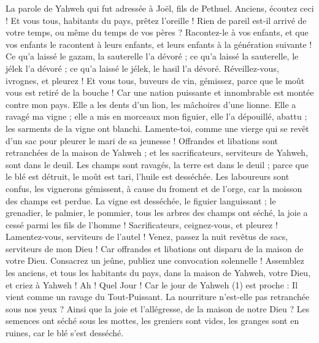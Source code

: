 \BFont
\begin{multicols}{2}
\TextTitle{[Introduction]}
\VerseOne{}La parole de Yahweh qui fut adressée à Joël, fils de Pethuel.
Anciens, écoutez ceci ! Et vous tous, habitants du pays, prêtez l'oreille ! Rien de pareil est-il arrivé de votre temps, ou même du temps de vos pères ?
Racontez-le à vos enfants, et que vos enfants le racontent à leurs enfants, et leurs enfants à la génération suivante !
Ce qu’a laissé le gazam, la sauterelle l’a dévoré ; ce qu’a laissé la sauterelle, le jélek l’a dévoré ; ce qu’a laissé le jélek, le hasil l’a dévoré.
Réveillez-vous, ivrognes, et pleurez ! Et vous tous, buveurs de vin, gémissez, parce que le moût vous est retiré de la bouche !
Car une nation puissante et innombrable est montée contre mon pays. Elle a les dents d’un lion, les mâchoires d’une lionne.
Elle a ravagé ma vigne ; elle a mis en morceaux mon figuier, elle l'a dépouillé, abattu ; les sarments de la vigne ont blanchi.
Lamente-toi, comme une vierge qui se revêt d'un sac pour pleurer le mari de sa jeunesse !
Offrandes et libations sont retranchées de la maison de Yahweh ; et les sacrificateurs, serviteurs de Yahweh, sont dans le deuil.
Les champs sont ravagés, la terre est dans le deuil ; parce que le blé est détruit, le moût est tari, l'huile est desséchée.
Les laboureurs sont confus, les vignerons gémissent, à cause du froment et de l'orge, car la moisson des champs est perdue.
La vigne est desséchée, le figuier languissant ; le grenadier, le palmier, le pommier, tous les arbres des champs ont séché, la joie a cessé parmi les fils de l’homme !
Sacrificateurs, ceignez-vous, et pleurez ! Lamentez-vous, serviteurs de l’autel ! Venez, passez la nuit revêtus de sacs, serviteurs de mon Dieu ! Car offrandes et libations ont disparu de la maison de votre Dieu.
Consacrez un jeûne, publiez une convocation solennelle ! Assemblez les anciens, et tous les habitants du pays, dans la maison de Yahweh, votre Dieu, et criez à Yahweh !
Ah ! Quel Jour ! Car le jour de Yahweh (1) est proche : Il vient comme un ravage du Tout-Puissant.
La nourriture n’est-elle pas retranchée sous nos yeux ? Ainsi que la joie et l'allégresse, de la maison de notre Dieu ?
Les semences ont séché sous les mottes, les greniers sont vides, les granges sont en ruines, car le blé s’est desséché.

\end{multicols}
